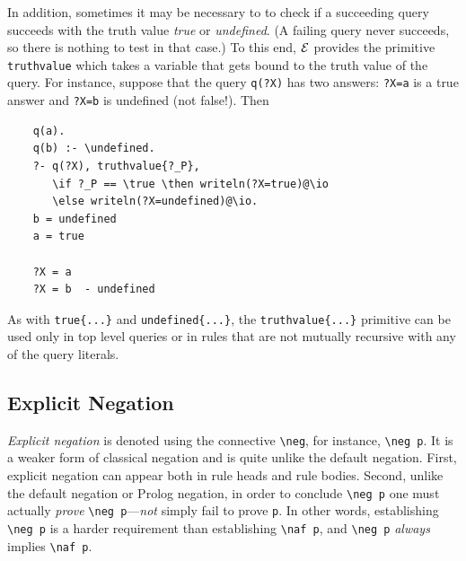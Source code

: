 \documentclass[11pt]{article}
\newcommand{\ERGO}{\mbox{\ensuremath{\cal{E}}\smaller{{\sc{RGO}}}}\xspace}
\newcommand{\FLSYSTEM}{\ERGO}
\newcommand{\bs}{\textbackslash}
\newcommand{\RULELOGNAF}{{\texttt{{\bs}naf}}\xspace}
\newcommand{\RULELOGNEG}{{\texttt{{\bs}neg}}\xspace}
\begin{document}
In addition, sometimes it may be necessary to to check if a succeeding
query succeeds with the truth value \emph{true} or
\emph{undefined}. (A failing query never succeeds, so there is nothing to
test in that case.)  To this end, \FLSYSTEM provides the primitive
\texttt{truthvalue} which takes a variable that gets bound to the truth
value of the query. For instance, suppose that the query \texttt{q(?X)} has
two answers: \texttt{?X=a} is a true answer and \texttt{?X=b} is undefined
(not false!). Then
\begin{verbatim}
    q(a).
    q(b) :- \undefined.
    ?- q(?X), truthvalue{?_P},
       \if ?_P == \true \then writeln(?X=true)@\io
       \else writeln(?X=undefined)@\io.
    b = undefined
    a = true

    ?X = a
    ?X = b  - undefined
\end{verbatim}
As with {\tt true\{...\}}  and {\tt undefined\{...\}}, the
\texttt{truthvalue\{...\}} primitive can be used only in top level queries or
in rules that are not mutually recursive with any of the query literals.

\subsection{Explicit Negation}
\label{sec-explicit-negation}

\emph{Explicit negation} is denoted using the connective {\tt \RULELOGNEG}, for
instance, {\tt \RULELOGNEG p}. It is a weaker form of classical negation and is
quite unlike the default negation. First, explicit negation can appear both
in rule heads and rule bodies. Second, unlike the default negation or
Prolog negation, in order to conclude {\tt \RULELOGNEG p} one must actually
\emph{prove} {\tt \RULELOGNEG p}---\emph{not} simply
fail to prove {\tt p}. In other words, establishing \texttt{\RULELOGNEG p}
is a harder requirement than establishing \texttt{\RULELOGNAF p},
and \texttt{\RULELOGNEG p} \emph{always} implies   \texttt{\RULELOGNAF p}.
\end{document}

